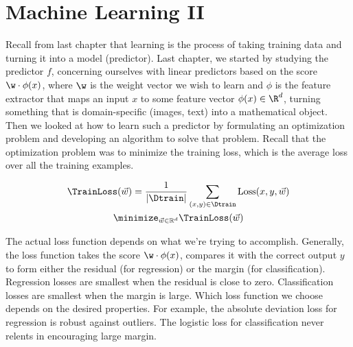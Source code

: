 
\chapter{Machine Learning II} %
\label{cha:machine_learning_ii}


Recall from last chapter that learning is the process of taking training data and turning it into a model (predictor).
% 
Last chapter, we started by studying the predictor $f$,
concerning ourselves with linear predictors based on the score $\w \cdot \phi(x)$,
where $\w$ is the weight vector we wish to learn and $\phi$
is the feature extractor that maps an input $x$ to some feature vector $\phi(x) \in \R^d$,
turning something that is domain-specific (images, text) into a mathematical object.
% 
Then we looked at how to learn such a predictor by formulating an optimization problem
and developing an algorithm to solve that problem.
% 
Recall that the optimization problem was to minimize the training loss, which is the average loss over all the training examples.

\begin{gather*}		
	\TrainLoss(\vec{w}) = \frac{1}{|\Dtrain|} \sum_{(x,y) \in \Dtrain} \operatorname{Loss}(x,y,\vec{w})\\
	\minimize_{\vec{w} \in \mathbb{R}^d} \TrainLoss(\vec{w})
\end{gather*}

The actual loss function depends on what we're trying to accomplish.
Generally, the loss function takes the score $\w\cdot\phi(x)$,
compares it with the correct output $y$ to form either the residual (for regression)
or the margin (for classification).
% 
Regression losses are smallest when the residual is close to zero.
Classification losses are smallest when the margin is large.
Which loss function we choose depends on the desired properties.
For example, the absolute deviation loss for regression is robust against outliers.
The logistic loss for classification never relents in encouraging large margin.

